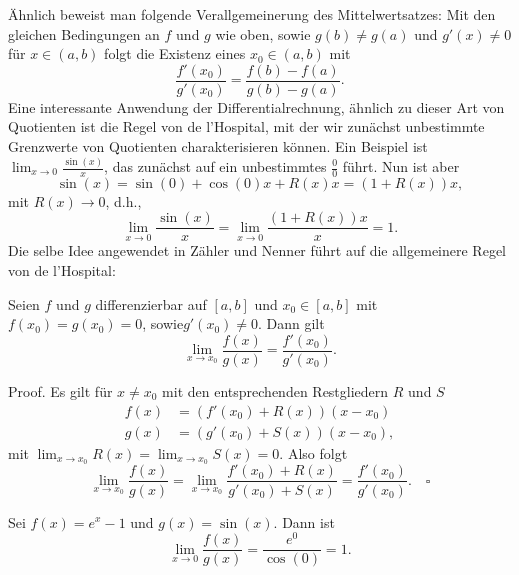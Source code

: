 \documentclass[letterpaper,10pt,english]{jupyterBook}
\begin{document}
Ähnlich beweist man folgende Verallgemeinerung des Mittelwertsatzes: Mit den gleichen Bedingungen an \(f\) und \(g\) wie oben, sowie \(g(b) \neq g(a)\) und \(g'(x) \neq 0\) für \(x \in (a,b)\) folgt die Existenz eines \(x_0 \in (a,b)\) mit
\begin{equation*}
\frac{f'(x_0)}{g'(x_0)} = \frac{f(b) - f(a)}{g(b) - g(a)}.
\end{equation*}
Eine interessante Anwendung der Differentialrechnung, ähnlich zu dieser Art von Quotienten ist die Regel von de l’Hospital, mit der wir zunächst unbestimmte Grenzwerte von Quotienten charakterisieren können. Ein Beispiel ist\( \lim_{x \rightarrow 0} \frac{\sin(x)}x\), das zunächst auf ein unbestimmtes \(\frac{0}0\) führt. Nun ist aber
\begin{equation*}
\sin(x) = \sin(0) + \cos(0)x + R(x)x = (1+R(x))x,
\end{equation*}
mit \(R(x) \rightarrow 0\), d.h.,
\begin{equation*}
 \lim_{x \rightarrow 0} \frac{\sin(x)}x = \lim_{x \rightarrow 0} \frac{(1+R(x))x}x = 1.
\end{equation*}
Die selbe Idee angewendet in Zähler und Nenner führt auf die allgemeinere Regel von de l’Hospital:
\label{differential/mws:theorem-2}
\begin{theorem}{}{}



Seien \(f\) und \(g\) differenzierbar auf \([a,b]\) und \(x_0 \in [a,b]\) mit \(f(x_0)=g(x_0) = 0\), sowie\(g'(x_0) \neq 0\). Dann gilt
\begin{equation*}
 \lim_{x \rightarrow x_0} \frac{f(x)}{g(x)} = \frac{f'(x_0)}{g'(x_0)}.
\end{equation*}\end{theorem}

\begin{emphBox}{}{}
Proof.  Es gilt für \(x \neq x_0\) mit den entsprechenden Restgliedern \(R\) und \(S\)
\begin{align*}
f(x) &= (f'(x_0) + R(x))(x-x_0) \\
g(x) &= (g'(x_0) + S(x))(x-x_0),
\end{align*}
mit \(\lim_{x \rightarrow x_0} R(x) = \lim_{x \rightarrow x_0} S(x) =0. \)
Also folgt
\begin{equation*}
\lim_{x \rightarrow x_0} \frac{f(x)}{g(x)} = \lim_{x \rightarrow x_0} \frac{f'(x_0) + R(x)}{g'(x_0) + S(x)} = \frac{f'(x_0)}{g'(x_0)}.  \quad\square
\end{equation*}\end{emphBox}
\label{differential/mws:example-3}
\begin{example}{}{}



Sei \(f(x) = e^x-1\) und \(g(x) = \sin(x)\). Dann ist
\begin{equation*}
 \lim_{x \rightarrow 0} \frac{f(x)}{g(x)} = \frac{e^0}{\cos(0)} = 1.
\end{equation*}\end{example}
\end{document}
